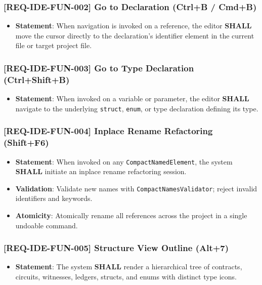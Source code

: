\subsubsection{[REQ-IDE-FUN-002] Go to Declaration (Ctrl+B / Cmd+B)}
\begin{itemize}
    \item \textbf{Statement}: When navigation is invoked on a reference, the editor \textbf{SHALL} move the cursor directly to the declaration's identifier element in the current file or target project file.
\end{itemize}

\subsubsection{[REQ-IDE-FUN-003] Go to Type Declaration (Ctrl+Shift+B)}
\begin{itemize}
    \item \textbf{Statement}: When invoked on a variable or parameter, the editor \textbf{SHALL} navigate to the underlying \texttt{struct}, \texttt{enum}, or type declaration defining its type.
\end{itemize}

\subsubsection{[REQ-IDE-FUN-004] Inplace Rename Refactoring (Shift+F6)}
\begin{itemize}
    \item \textbf{Statement}: When invoked on any \texttt{CompactNamedElement}, the system \textbf{SHALL} initiate an inplace rename refactoring session.
    \item \textbf{Validation}: Validate new names with \texttt{CompactNamesValidator}; reject invalid identifiers and keywords.
    \item \textbf{Atomicity}: Atomically rename all references across the project in a single undoable command.
\end{itemize}

\subsubsection{[REQ-IDE-FUN-005] Structure View Outline (Alt+7)}
\begin{itemize}
    \item \textbf{Statement}: The system \textbf{SHALL} render a hierarchical tree of contracts, circuits, witnesses, ledgers, structs, and enums with distinct type icons.
\end{itemize}

